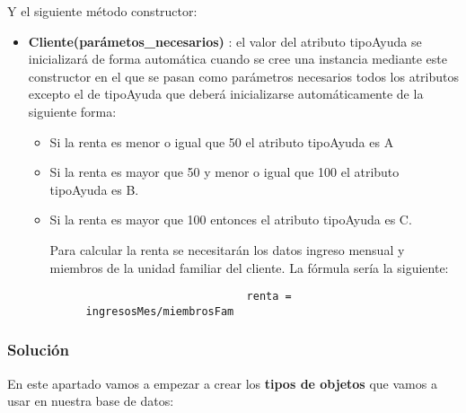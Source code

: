 \begin{enumerate}[label=\alph*)]
     Y el siguiente método constructor:
     \begin{itemize}
         \item \textbf{Cliente(parámetos\_necesarios)} : el valor del atributo tipoAyuda se inicializará de forma automática cuando se cree una instancia mediante este constructor en el que se pasan como parámetros necesarios todos los atributos excepto el de tipoAyuda que deberá inicializarse automáticamente de la siguiente forma:
         \begin{itemize}
             \item Si la renta es menor o igual que 50 el atributo tipoAyuda es A
             \item Si la renta es mayor que 50 y menor o igual que 100 el atributo tipoAyuda es B.
             \item Si la renta es mayor que 100 entonces el atributo tipoAyuda es C.

             Para calcular la renta se necesitarán los datos ingreso mensual y miembros de la unidad familiar del cliente. La fórmula sería la siguiente:

               \begin{figure}[H]
                 \begin{tcolorbox}[sharp corners, colback=yellow!30, colframe=white!20]
                     \scriptsize
                     \begin{verbatim}
                         renta = ingresosMes/miembrosFam\end{verbatim}
                 \end{tcolorbox}
             \end{figure}
         \end{itemize}
     \end{itemize}
\end{enumerate}

\subsubsection{Solución}
En este apartado vamos a empezar a crear los \textbf{tipos de objetos} que vamos a usar en nuestra base de datos:

